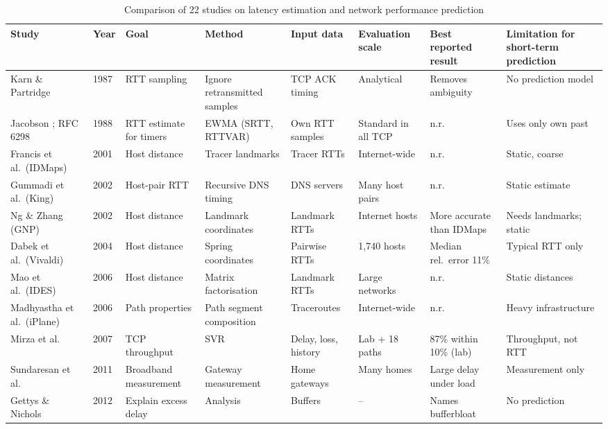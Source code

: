 \documentclass[pdflatex,sn-mathphys-num]{sn-jnl}
\begin{document}
\begin{table}
\caption{Comparison of 22 studies on latency estimation and network performance prediction}\label{tab:comparison}
\centering
\scriptsize
\setlength{\tabcolsep}{3pt}
\begin{tabular}{@{}p{2.8cm}p{0.6cm}p{2.5cm}p{2.7cm}p{2.9cm}p{2.6cm}p{2.9cm}p{3.6cm}@{}}
\toprule
Study & Year & Goal & Method & Input data & Evaluation scale & Best reported result & Limitation for short-term prediction \\
\midrule
Karn \& Partridge \cite{karn1987} & 1987 & RTT sampling & Ignore retransmitted samples & TCP ACK timing & Analytical & Removes ambiguity & No prediction model \\
Jacobson \cite{jacobson1988}; RFC 6298 \cite{rfc6298} & 1988 & RTT estimate for timers & EWMA (SRTT, RTTVAR) & Own RTT samples & Standard in all TCP & n.r. & Uses only own past \\
Francis et al.\ (IDMaps) \cite{francis2001idmaps} & 2001 & Host distance & Tracer landmarks & Tracer RTTs & Internet-wide & n.r. & Static, coarse \\
Gummadi et al.\ (King) \cite{gummadi2002king} & 2002 & Host-pair RTT & Recursive DNS timing & DNS servers & Many host pairs & n.r. & Static estimate \\
Ng \& Zhang (GNP) \cite{ng2002gnp} & 2002 & Host distance & Landmark coordinates & Landmark RTTs & Internet hosts & More accurate than IDMaps & Needs landmarks; static \\
Dabek et al.\ (Vivaldi) \cite{dabek2004vivaldi} & 2004 & Host distance & Spring coordinates & Pairwise RTTs & 1,740 hosts & Median rel.\ error 11\% & Typical RTT only \\
Mao et al.\ (IDES) \cite{mao2006ides} & 2006 & Host distance & Matrix factorisation & Landmark RTTs & Large networks & n.r. & Static distances \\
Madhyastha et al.\ (iPlane) \cite{madhyastha2006iplane} & 2006 & Path properties & Path segment composition & Traceroutes & Internet-wide & n.r. & Heavy infrastructure \\
Mirza et al.\ \cite{mirza2007tcp} & 2007 & TCP throughput & SVR & Delay, loss, history & Lab + 18 paths & 87\% within 10\% (lab) & Throughput, not RTT \\
Sundaresan et al.\ \cite{sundaresan2011broadband} & 2011 & Broadband measurement & Gateway measurement & Home gateways & Many homes & Large delay under load & Measurement only \\
Gettys \& Nichols \cite{gettys2012bufferbloat} & 2012 & Explain excess delay & Analysis & Buffers & -- & Names bufferbloat & No prediction \\

\end{tabular}
\end{table}
\end{document}
